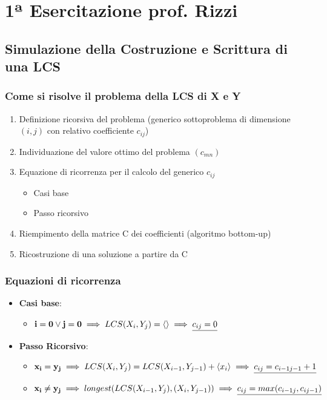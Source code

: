 
\chapter{1ª Esercitazione prof. Rizzi}

\section{Simulazione della Costruzione e Scrittura di una LCS}

\subsection{Come si risolve il problema della LCS di X e Y}
\begin{enumerate}
    \item Definizione ricorsiva del problema (generico sottoproblema di dimensione $(i,j)$ con relativo coefficiente $c_{ij}$)
    \item Individuazione del valore ottimo del problema $(c_{mn})$
    \item Equazione di ricorrenza per il calcolo del generico $c_{ij}$
    \begin{itemize}
        \item Casi base
        \item Passo ricorsivo
    \end{itemize}
    \item Riempimento della matrice C dei coefficienti (algoritmo bottom-up)
    \item Ricostruzione di una soluzione a partire da C
\end{enumerate}

\subsection{Equazioni di ricorrenza}
\begin{itemize}
    \item \textbf{Casi base}:
    \begin{itemize}
        \item $\mathbf{i=0 \lor j=0} \implies LCS(X_i,Y_j)=\langle\rangle \implies \uline{c_{ij}=0}$
    \end{itemize}
    \item \textbf{Passo Ricorsivo}:
    \begin{itemize}
        \item $\mathbf{x_i=y_j} \implies LCS(X_i,Y_j) = LCS(X_{i-1},Y_{j-1})+ \langle x_i \rangle \implies \uline{c_{ij} = c_{i-1j-1}+1}$
        \item $\mathbf{x_i \not = y_j} \implies longest(LCS(X_{i-1}, Y_j),(X_i,Y_{j-1})) \implies \uline{c_{ij} = max(c_{i-1j},c_{ij-1})}$
    \end{itemize}
\end{itemize}

